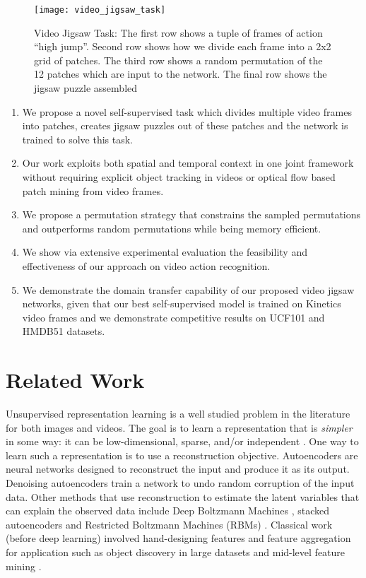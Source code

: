 \documentclass[10pt,twocolumn,letterpaper]{article}
\begin{document}
\begin{figure}[t]
\centering
\texttt{[image: video\_jigsaw\_task]}
\caption{Video Jigsaw Task: The first row shows a tuple of frames of action ``high jump''. Second row shows how we divide each frame into a 2x2 grid of patches. The third row shows a random permutation of the 12 patches which are input to the network. The final row shows the jigsaw puzzle assembled}
\label{fig1}
\end{figure}

\begin{enumerate}
 \item We propose a novel self-supervised task which divides multiple video frames into patches, creates jigsaw puzzles out of these patches and the network is trained to solve this task.
 \item Our work exploits both spatial and temporal context in one joint framework without requiring explicit object tracking in videos or optical flow based patch mining from video frames.
 \item We propose a permutation strategy that constrains the sampled permutations and outperforms random permutations while being memory efficient. 
 \item We show via extensive experimental evaluation the feasibility and effectiveness of our approach on video action recognition. 
 \item We demonstrate the domain transfer capability of our proposed video jigsaw networks, given that our best self-supervised model is trained on Kinetics \cite{kay2017kinetics} video frames and we demonstrate competitive results on UCF101 \cite{soomro2012ucf101} and HMDB51\cite{kuehne2011hmdb} datasets.
\end{enumerate}

\section{Related Work}
Unsupervised representation learning is a well studied problem in the literature for both images and videos. The goal is to learn a representation that is \textit{simpler} in some way: it can be low-dimensional, sparse, and/or independent \cite{goodfellow2016deep}. One way to learn such a representation is to use a reconstruction objective. Autoencoders \cite{hinton2006reducing} are neural networks designed to reconstruct the input and produce it as its output. Denoising autoencoders \cite{vincent2008extracting} train a network to undo random corruption of the input data. Other methods that use reconstruction to estimate the latent variables that can explain the observed data include Deep Boltzmann Machines \cite{salakhutdinov2010efficient}, stacked autoencoders \cite{lee2007efficient,bengio2007greedy} and Restricted Boltzmann Machines (RBMs) \cite{hinton1986learning,smolensky1986information}. Classical work (before deep learning) involved hand-designing features and feature aggregation for application such as object discovery in large datasets \cite{sivic2005discovering,russell2006using} and mid-level feature mining \cite{doersch2013mid,singh2012unsupervised,sun2013learning}. 
\end{document}
